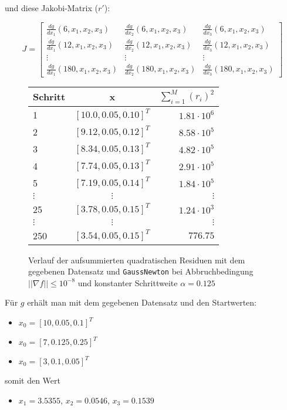 \documentclass[a4paper, 12pt]{report}
\begin{document}
und diese Jakobi-Matrix ($r'$):

$$ J = \begin{bmatrix}
  \frac{dg}{dx_1}(6, x_1, x_2, x_3) & \frac{dg}{dx_2}(6, x_1, x_2, x_3) & \frac{dg}{dx_3}(6, x_1, x_2, x_3)\\
  \frac{dg}{dx_1}(12, x_1, x_2, x_3) & \frac{dg}{dx_2}(12, x_1, x_2, x_3) & \frac{dg}{dx_3}(12, x_1, x_2, x_3)\\
  \vdots & \vdots & \vdots\\
  \frac{dg}{dx_1}(180, x_1, x_2, x_3) & \frac{dg}{dx_2}(180, x_1, x_2, x_3) & \frac{dg}{dx_3}(180, x_1, x_2, x_3)
\end{bmatrix}$$

\begin{figure}[H]
  \centering
  \def\arraystretch{1.25}
  \begin{tabular}{l|c|r}
    \hline
    \textbf{Schritt} & \textbf{x} & \textbf{$\sum_{i=1}^M (r_i)^2$}\\
    \hline
    1 & $[10.0, 0.05, 0.10]^T$ & $1.81\cdot 10^{6}$\\
    2 & $[9.12, 0.05, 0.12]^T$ & $8.58\cdot 10^{5}$\\
    3 & $[8.34, 0.05, 0.13]^T$ & $4.82\cdot 10^{5}$\\
    4 & $[7.74, 0.05, 0.13]^T$ & $2.91\cdot 10^{5}$\\
    5 & $[7.19, 0.05, 0.14]^T$ & $1.84\cdot 10^{5}$\\
    $\vdots$ & $\vdots$ & $\vdots$\\
    25 & $[3.78, 0.05, 0.15]^T$ & $1.24\cdot 10^{3}$\\
    $\vdots$ & $\vdots$ & $\vdots$\\
    250 & $[3.54, 0.05, 0.15]^T$ & $776.75$\\
    \hline
  \end{tabular}
  \caption{Verlauf der aufsummierten quadratischen Residuen mit dem gegebenen Datensatz und
        \lstinline[basicstyle=\ttfamily\color{black}]|GaussNewton| bei Abbruchbedingung $||\nabla f|| \leq 10^{-8}$
        und konstanter Schrittweite $\alpha = 0.125$ }
\end{figure}

Für $g$ erhält man mit dem gegebenen Datensatz und den Startwerten:
\begin{itemize}
  \item $x_0 = [10, 0.05, 0.1]^T$
  \item $x_0 = [7, 0.125, 0.25]^T$
  \item $x_0 = [3, 0.1, 0.05]^T$
\end{itemize}
somit den Wert
\begin{itemize}
  \item $x_1 = 3.5355$, $x_2 = 0.0546$, $x_3 = 0.1539$
\end{itemize}
\end{document}
